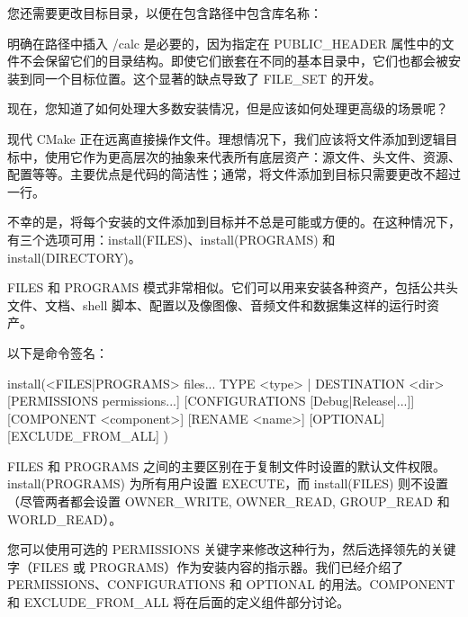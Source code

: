 您还需要更改目标目录，以便在包含路径中包含库名称：



明确在路径中插入 /calc 是必要的，因为指定在 PUBLIC\_HEADER 属性中的文件不会保留它们的目录结构。即使它们嵌套在不同的基本目录中，它们也都会被安装到同一个目标位置。这个显著的缺点导致了 FILE\_SET 的开发。

现在，您知道了如何处理大多数安装情况，但是应该如何处理更高级的场景呢？


现代 CMake 正在远离直接操作文件。理想情况下，我们应该将文件添加到逻辑目标中，使用它作为更高层次的抽象来代表所有底层资产：源文件、头文件、资源、配置等等。主要优点是代码的简洁性；通常，将文件添加到目标只需要更改不超过一行。

不幸的是，将每个安装的文件添加到目标并不总是可能或方便的。在这种情况下，有三个选项可用：install(FILES)、install(PROGRAMS) 和 install(DIRECTORY)。


FILES 和 PROGRAMS 模式非常相似。它们可以用来安装各种资产，包括公共头文件、文档、shell 脚本、配置以及像图像、音频文件和数据集这样的运行时资产。

以下是命令签名：

\begin{shell}
install(<FILES|PROGRAMS> files...
        TYPE <type> | DESTINATION <dir>
        [PERMISSIONS permissions...]
        [CONFIGURATIONS [Debug|Release|...]]
        [COMPONENT <component>]
        [RENAME <name>] [OPTIONAL] [EXCLUDE_FROM_ALL]
)
\end{shell}

FILES 和 PROGRAMS 之间的主要区别在于复制文件时设置的默认文件权限。install(PROGRAMS) 为所有用户设置 EXECUTE，而 install(FILES) 则不设置（尽管两者都会设置 OWNER\_WRITE, OWNER\_READ, GROUP\_READ 和 WORLD\_READ）。

您可以使用可选的 PERMISSIONS 关键字来修改这种行为，然后选择领先的关键字（FILES 或 PROGRAMS）作为安装内容的指示器。我们已经介绍了 PERMISSIONS、CONFIGURATIONS 和 OPTIONAL 的用法。COMPONENT 和 EXCLUDE\_FROM\_ALL 将在后面的定义组件部分讨论。

